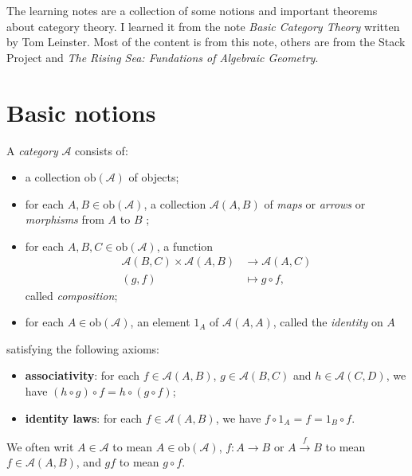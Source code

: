 \thispagestyle{empty}
The learning notes are a collection of some notions and important theorems about category theory. I learned it from the note \textit{Basic Category Theory} written by Tom Leinster. Most of the content is from this note, others are from the Stack Project and \textit{The Rising Sea: Fundations of Algebraic Geometry}. 
\tableofcontents
\section{Basic notions}
\begin{definition}
  A \textit{category} $\mathscr{A}$ consists of:
  \begin{itemize}
    \item a collection $\mathrm{ob}(\mathscr{A})$ of objects;
    \item for each $A,B \in \mathrm{ob}(\mathscr{A})$, a collection $\mathscr{A}(A,B)$ of \textit{maps} or \textit{arrows} or \textit{morphisms} from $A$ to $B$ ;
    \item for each $A,B,C \in \mathrm{ob}(\mathscr{A})$, a function
      \begin{align*}
	\mathscr{A}(B,C)\times \mathscr{A}(A,B) & \to \mathscr{A}(A,C)\\
	(g,f)&\mapsto g\circ f,
      \end{align*}
      called \textit{composition};
    \item for each $A\in \mathrm{ob}(\mathscr{A})$, an element $1_A$ of $\mathscr{A}(A,A)$, called the \textit{identity} on $A$ 
    \end{itemize}
    satisfying the following axioms:
    \begin{itemize}
      \item \textbf{associativity}: for each $f\in \mathscr{A}(A,B)$, $g\in \mathscr{A}(B,C)$ and $h\in \mathscr{A}(C,D)$, we have $\left( h\circ g \right) \circ f=h\circ (g\circ f)$;
      \item \textbf{identity laws}: for each $f\in \mathscr{A}(A,B)$, we have $f\circ 1_A=f=1_B\circ f$.
  \end{itemize}
\end{definition}

\begin{remark}
  We often writ $A\in \mathscr{A}$ to mean $A\in \mathrm{ob}(\mathscr{A})$, $f:A\to B$ or $A\xrightarrow{f}B$ to mean $f\in \mathscr{A}(A,B)$, and $gf$ to mean $g\circ f$.
\end{remark}

